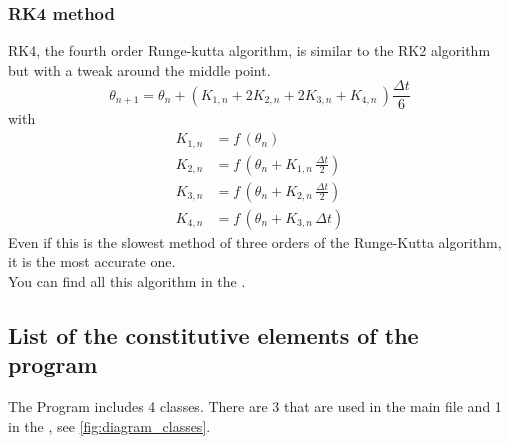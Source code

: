 \documentclass[1pt, a4paper]{article}
\begin{document}
\subsubsection{RK4 method}
\label{subsubs:RK4}
RK4, the fourth order Runge-kutta algorithm, is similar to the RK2 algorithm but with a tweak around the middle point.
\begin{equation}
    \theta_{n+1} = \theta_n + (K_{1,n} + 2K_{2,n} + 2K_{3,n} + K_{4,n}\,)\frac{\Delta t}{6}
\end{equation}
with
\begin{equation}
    \begin{aligned}
        K_{1,n} &= f\,\left(\theta_n\right)\\
        K_{2,n} &= f\,\left(\theta_n + K_{1,n}\,\frac{\Delta t}{2}\right)\\
        K_{3,n} &= f\,\left(\theta_n + K_{2,n}\,\frac{\Delta t}{2}\right)\\
        K_{4,n} &= f\,\left(\theta_n + K_{3,n}\,\Delta t\right)
    \end{aligned}
\end{equation}
Even if this is the slowest method of three orders of the Runge-Kutta algorithm, it is the most accurate one.\\
You can find all this algorithm in the .
\subsection{List of the constitutive elements of the program}
\label{subs:3.3}
The Program includes 4 classes. There are 3 that are used in the main file and 1 in the , see \autoref{fig:diagram_classes}. 
\end{document}
